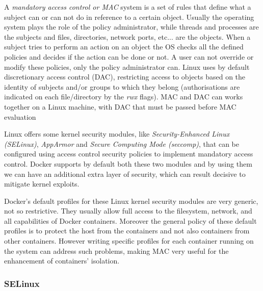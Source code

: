 \documentclass[a4paper,12pt]{article}
\begin{document}
A \textit{mandatory access control or MAC} system is a set of rules that define
what a subject can or can not do in reference to a certain object. Usually the
operating system plays the role of the policy administrator, while threads and
processes are the subjects and files, directories, network ports, etc... are the
objects. When a subject tries to perform an action on an object the OS checks
all the defined policies and decides if the action can be done or not. A user
can not override or modify these policies, only the policy administrator
can\cite{wiki_MAC}. Linux uses by default discretionary access control (DAC),
restricting access to objects based on the identity of subjects and/or groups to
which they belong (authorisations are indicated on each file/directory by the
\textit{rwx} flags). MAC and DAC can works together on a Linux machine, with DAC
that must be passed before MAC evaluation \par Linux offers some kernel security
modules, like \textit{Security-Enhanced Linux (SELinux)}, \textit{AppArmor} and
\textit{Secure Computing Mode (seccomp)}, that can be configured using access
control security policies to implement mandatory access control. Docker supports
by default both these two modules and by using them we can have an additional
extra layer of security, which can result decisive to mitigate kernel exploits.
\par Docker's default profiles for these Linux kernel security modules are very
generic, not so restrictive. They usually allow full access to the filesystem,
network, and all capabilities of Docker containers. Moreover the general policy
of these default profiles is to protect the host from the containers and not
also containers from other containers\cite{to_docker_or_not_to_docker}. However
writing specific profiles for each container running on the system can address
such problems, making MAC very useful for the enhancement of containers'
isolation.

\subsubsection{SELinux}
\end{document}
